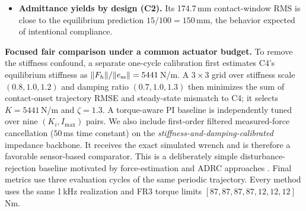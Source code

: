 \documentclass[journal]{IEEEtran}
\begin{document}
\begin{itemize}[leftmargin=*,itemsep=1pt,topsep=2pt]
the steady-state error. C7 combines both and gives the lowest
contact-window RMS and, of the exactly reported values, steady-state
error of any controller. Under the rate-proportional $Q_w$ scaling of
Table~\ref{tab:params}, however, C7 no longer has the lowest peak
deflection: C6's 1.1\,mm undercuts C7's 1.48\,mm, since at 500\,Hz the
faster rate alone already damps the first-contact transient and the
estimator's additional corrective action adds excess control effort
during that same window. C7's total RMS (12.7\,mm, averaged over the
whole cycle) is marginally higher than C4/C5's (11.4\,mm), since the
faster rate sharpens the contact transient without improving
free-motion tracking.
\item \textbf{Admittance yields by design (C2).} Its 174.7\,mm
contact-window RMS is close to the equilibrium prediction
$15/100=150$\,mm, the behavior expected of intentional compliance.
\end{itemize}

\textbf{Focused fair comparison under a common actuator budget.}
To remove the stiffness confound, a separate one-cycle calibration first
estimates C4's equilibrium stiffness as
$\|F_h\|/\|e_{\rm ss}\|=5441$\,N/m. A $3\times3$ grid over stiffness scale
$(0.8,1.0,1.2)$ and damping ratio $(0.7,1.0,1.3)$ then minimizes the sum of
contact-onset trajectory RMSE and steady-state mismatch to C4; it selects
$K=5441$\,N/m and $\zeta=1.3$. A torque-aware PI baseline is independently
tuned over nine $(K_i,I_{\max})$ pairs. We also include first-order filtered
measured-force cancellation ($50$\,ms time constant) on the
\emph{stiffness-and-damping-calibrated} impedance backbone. It receives the exact simulated
wrench and is therefore a favorable sensor-based comparator. This is a deliberately simple disturbance-rejection
baseline motivated by force-estimation and ADRC approaches
\cite{jordana2024force,wu2025ensuring}. Final metrics use three evaluation cycles of the same periodic
trajectory. Every method uses the same
1\,kHz realization and FR3 torque limits
$[87,87,87,87,12,12,12]$\,Nm.
\end{document}
